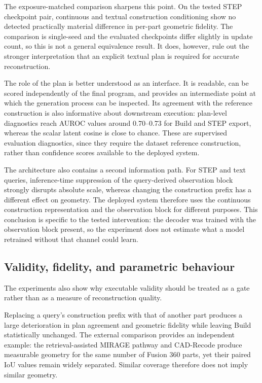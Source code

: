 \documentclass[preprint,12pt]{elsarticle}
\begin{document}
The exposure-matched comparison sharpens this point. On the tested STEP
checkpoint pair, continuous and textual construction conditioning show no
detected practically material difference in per-part geometric fidelity. The
comparison is single-seed and the evaluated checkpoints differ slightly in
update count, so this is not a general equivalence result. It does, however,
rule out the stronger interpretation that an explicit textual plan is required
for accurate reconstruction.

The role of the plan is better understood as an interface. It is readable,
can be scored independently of the final program, and provides an intermediate
point at which the generation process can be inspected. Its agreement with the
reference construction is also informative about downstream execution:
plan-level diagnostics reach AUROC values around 0.70--0.73 for Build and STEP
export, whereas the scalar latent cosine is close to chance. These are
supervised evaluation diagnostics, since they require the dataset reference
construction, rather than confidence scores available to the deployed system.

The architecture also contains a second information path. For STEP and text
queries, inference-time suppression of the query-derived observation block
strongly disrupts absolute scale, whereas changing the construction prefix has
a different effect on geometry. The deployed system therefore uses the
continuous construction representation and the observation block for different
purposes. This conclusion is specific to the tested intervention: the decoder
was trained with the observation block present, so the experiment does not
estimate what a model retrained without that channel could learn.


\subsection{Validity, fidelity, and parametric behaviour}
\label{sec:disc_evaluation}

The experiments also show why executable validity should be treated as a gate
rather than as a measure of reconstruction quality.

Replacing a query's construction prefix with that of another part produces a
large deterioration in plan agreement and geometric fidelity while leaving
Build statistically unchanged. The external comparison provides an independent
example: the retrieval-assisted MIRAGE pathway and CAD-Recode produce
measurable geometry for the same number of Fusion 360 parts, yet their paired
IoU values remain widely separated. Similar coverage therefore does not imply
similar geometry.
\end{document}
